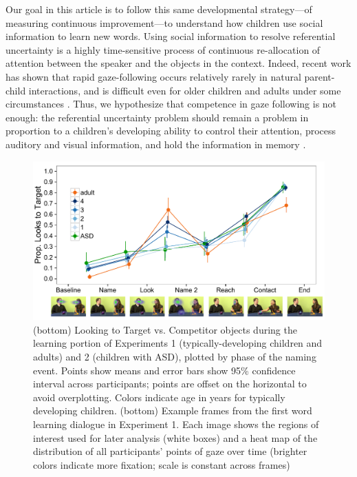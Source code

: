 \documentclass{pnastwo}
\begin{document}
\begin{article}
Our goal in this article is to follow this same developmental strategy---of measuring continuous improvement---to understand how children use social information to learn new words. Using social information to resolve referential uncertainty is a highly time-sensitive process of continuous re-allocation of attention between the speaker and the objects in the context. Indeed, recent work has shown that rapid gaze-following occurs relatively rarely in natural parent-child interactions, and is difficult even for older children and adults under some circumstances \citep{loomis2008, vida2012, yu2013}. Thus, we hypothesize that competence in gaze following is not enough: the referential uncertainty problem should remain a problem in proportion to a children's developing ability to control their attention, process auditory and visual information, and hold the information in memory \citep{dempster1981, kail1991, gathercole2004}.

\begin{figure}
        \includegraphics[width=.95\textwidth]{figures/bronto_all.pdf}
	\caption{\label{fig:reflook_learning} (bottom) Looking to Target vs. Competitor objects during the learning portion of Experiments 1 (typically-developing children and adults) and 2 (children with ASD), plotted by phase of the naming event. Points show means and error bars show 95\% confidence interval across participants; points are offset on the horizontal to avoid overplotting. Colors indicate age in years for typically developing children. (bottom) Example frames from the first word learning dialogue in Experiment 1. Each image shows the regions of interest used for later analysis (white boxes) and a heat map of the distribution of all participants' points of gaze over time (brighter colors indicate more fixation; scale is constant across frames)}
\end{figure}


\end{article}
\end{document}
